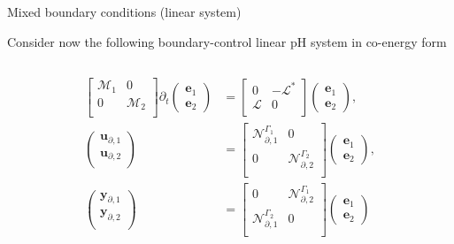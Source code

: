 \documentclass[aspectratio=169]{ISAE-Beamer}
\begin{document}
\begin{frame}{Mixed boundary conditions (linear system)}

Consider now the following boundary-control linear pH system in co-energy form 
\begin{columns}
\begin{column}{0.6\textwidth}
\begin{align*}
\begin{bmatrix}
\mathcal{M}_1 & 0 \\
0 & \mathcal{M}_2 \\
\end{bmatrix}
\partial_t \begin{pmatrix}
\bm{e}_1 \\ \bm{e}_2
\end{pmatrix} &= \begin{bmatrix}
0 &- \mathcal{L}^* \\
\mathcal{L} & 0 \\
\end{bmatrix}\begin{pmatrix}
\bm{e}_1 \\ \bm{e}_2
\end{pmatrix}, \\
\begin{pmatrix}
\bm{u}_{\partial, 1}\\
\bm{u}_{\partial, 2}\\
\end{pmatrix} &= \begin{bmatrix}
\mathcal{N}_{\partial, 1}^{\Gamma_1} & 0\\
0 & \mathcal{N}_{\partial, 2}^{\Gamma_2} \\
\end{bmatrix} \begin{pmatrix}
\bm{e}_1 \\ \bm{e}_2
\end{pmatrix}, \\
\begin{pmatrix}
\bm{y}_{\partial, 1}\\
\bm{y}_{\partial, 2}\\
\end{pmatrix} &= \begin{bmatrix}
0 & \mathcal{N}_{\partial, 2}^{\Gamma_1} \\
\mathcal{N}_{\partial, 1}^{\Gamma_2} & 0\\
\end{bmatrix} \begin{pmatrix}
\bm{e}_1 \\ \bm{e}_2

\end{pmatrix}
\end{align*}
\end{column}
\end{columns}
\end{frame}
\end{document}
